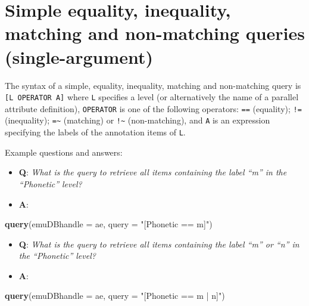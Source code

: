 \documentclass[]{book}
\newenvironment{Shaded}{\begin{snugshade}}{\end{snugshade}}
\newcommand{\DataTypeTok}[1]{\textcolor[rgb]{0.13,0.29,0.53}{#1}}
\newcommand{\KeywordTok}[1]{\textcolor[rgb]{0.13,0.29,0.53}{\textbf{#1}}}
\newcommand{\NormalTok}[1]{#1}
\newcommand{\StringTok}[1]{\textcolor[rgb]{0.31,0.60,0.02}{#1}}
\providecommand{\tightlist}{%
  \setlength{\itemsep}{0pt}\setlength{\parskip}{0pt}}
\theoremstyle{definition}
\theoremstyle{definition}
\theoremstyle{definition}
\theoremstyle{remark}
\begin{document}
\hypertarget{simple-equality-inequality-matching-non-matching-queries-single-argument}{%
\section{Simple equality, inequality, matching and non-matching queries
(single-argument)}\label{simple-equality-inequality-matching-non-matching-queries-single-argument}}

The syntax of a simple, equality, inequality, matching and non-matching
query is \texttt{{[}L\ OPERATOR\ A{]}} where \texttt{L} specifies a
level (or alternatively the name of a parallel attribute definition),
\texttt{OPERATOR} is one of the following operators: \texttt{==}
(equality); \texttt{!=} (inequality); \texttt{=\textasciitilde{}}
(matching) or \texttt{!\textasciitilde{}} (non-matching), and \texttt{A}
is an expression specifying the labels of the annotation items of
\texttt{L}.

Example questions and answers:

\begin{itemize}
\tightlist
\item
  \textbf{Q}: \emph{What is the query to retrieve all items containing
  the label ``m'' in the ``Phonetic'' level?}
\item
  \textbf{A}:
\end{itemize}

\begin{Shaded}
\begin{Highlighting}[]
\KeywordTok{query}\NormalTok{(}\DataTypeTok{emuDBhandle =}\NormalTok{ ae, }
      \DataTypeTok{query =} \StringTok{"[Phonetic == m]"}\NormalTok{)}
\end{Highlighting}
\end{Shaded}

\begin{itemize}
\tightlist
\item
  \textbf{Q}: \emph{What is the query to retrieve all items containing
  the label ``m'' or ``n'' in the ``Phonetic'' level?}
\item
  \textbf{A}:
\end{itemize}

\begin{Shaded}
\begin{Highlighting}[]
\KeywordTok{query}\NormalTok{(}\DataTypeTok{emuDBhandle =}\NormalTok{ ae, }
      \DataTypeTok{query =} \StringTok{"[Phonetic == m | n]"}\NormalTok{)}
\end{Highlighting}
\end{Shaded}
\end{document}
